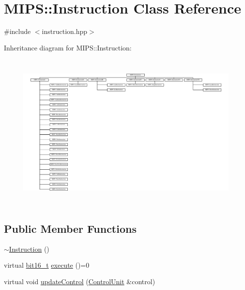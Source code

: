 \hypertarget{classMIPS_1_1Instruction}{}\section{M\+I\+PS\+:\+:Instruction Class Reference}
\label{classMIPS_1_1Instruction}


{\ttfamily \#include $<$instruction.\+hpp$>$}

Inheritance diagram for M\+I\+PS\+:\+:Instruction\+:\begin{figure}[H]
\begin{center}
\leavevmode
\includegraphics[height=7.952662cm]{classMIPS_1_1Instruction}
\end{center}
\end{figure}
\subsection*{Public Member Functions}
\begin{DoxyCompactItemize}
\item 
\hyperlink{classMIPS_1_1Instruction_ab99cb1c89cd950412585375681b1466d}{$\sim$\+Instruction} ()
\item 
virtual \hyperlink{core_8hpp_adc265a970bc35995b5879784bbb3f1b7}{bit16\+\_\+t} \hyperlink{classMIPS_1_1Instruction_a88668dfaf49dd8608f210ba13948d242}{execute} ()=0
\item 
virtual void \hyperlink{classMIPS_1_1Instruction_a7df847adef2997446ffca9b71c2f3112}{update\+Control} (\hyperlink{classMIPS_1_1ControlUnit}{Control\+Unit} \&control)
\end{DoxyCompactItemize}
